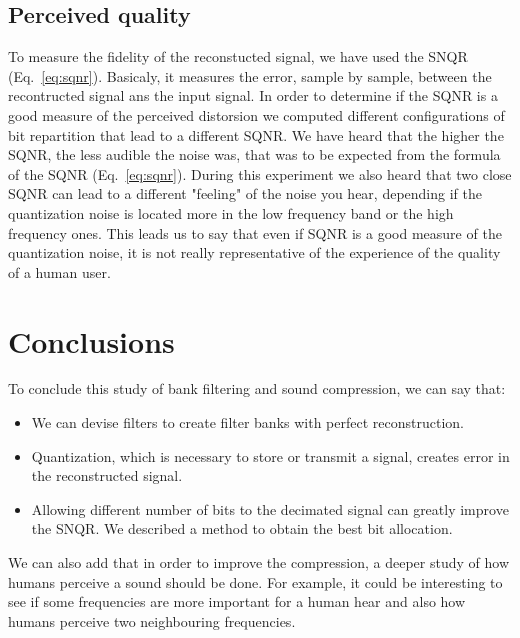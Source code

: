 \documentclass[a4paper,twocolumn]{article}
\begin{document}
\subsection{Perceived quality}
To measure the fidelity of the reconstucted signal, we have used the SNQR (Eq.~\ref{eq:sqnr}). Basicaly, it measures the error, sample by sample, between the recontructed signal ans the input signal. In order to determine if the SQNR is a good measure of the perceived distorsion we computed different configurations of bit repartition that lead to a different SQNR. We have heard that the higher the SQNR, the less audible the noise was, that was to be expected from the formula of the SQNR (Eq.~\ref{eq:sqnr}). During this experiment we also heard that two close SQNR can lead to a different "feeling" of the noise you hear, depending if the quantization noise is located more in the low frequency band or the high frequency ones. This leads us to say that even if SQNR is a good measure of the quantization noise, it is not really representative of the experience of the quality of a human user.


\section{Conclusions}
\label{sec:conclusions}

To conclude this study of bank filtering and sound compression, we can say that:
\begin{itemize}
\item We can devise filters to create filter banks with perfect reconstruction.
\item Quantization, which is necessary to store or transmit a signal, creates error in the reconstructed signal.
\item Allowing different number of bits to the decimated signal can greatly improve the SNQR. We described a method to obtain the best bit allocation.
\end{itemize}

We can also add that in order to improve the compression, a deeper study of how humans perceive a sound should be done. For example, it could be interesting to see if some frequencies are more important for a human hear and also how humans perceive two neighbouring frequencies.
\end{document}
